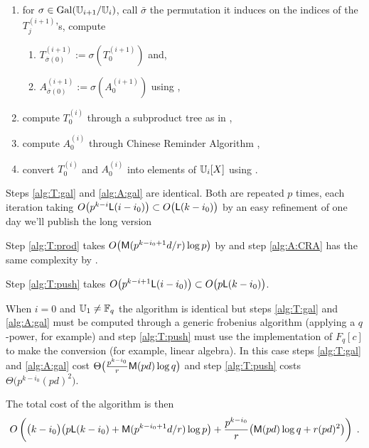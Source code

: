 \begin{enumerate}
\item for $\sigma \in \operatorname{Gal}(\mathbb{U}_{i+1}/\mathbb{U}_i)$, call $\bar\sigma$ the
  permutation it induces on the indices of the $T_j^{(i+1)}$'s,
  compute
  \begin{enumerate}
  \item\label{alg:T:gal} $T_{\bar\sigma(0)}^{(i+1)} :=
    \sigma\left(T_0^{(i+1)}\right)$ and,
  \item\label{alg:A:gal} $A_{\bar\sigma(0)}^{(i+1)} :=
    \sigma\left(A_0^{(i+1)}\right)$ using
    \cite[]{DFS09},
  \end{enumerate}
\item\label{alg:T:prod} compute $T_0^{(i)}$ through a subproduct tree
  as in \cite[Algo. 10.3]{vzGG},
\item\label{alg:A:CRA} compute $A_0^{(i)}$ through Chinese Reminder
  Algorithm \cite[Algo. 10.16]{vzGG},
\item\label{alg:T:push} convert $T_0^{(i)}$ and $A_0^{(i)}$ into
  elements of $\mathbb{U}_i[X]$ using \cite[]{DFS09}.
\end{enumerate}

Steps \ref{alg:T:gal} and \ref{alg:A:gal} are identical. Both are
repeated $p$ times, each iteration taking $O\bigl(p^{k-i}{\sf
  L}(i-i_0)\bigr) \subset O\bigl({\sf L}(k-i_0)\bigr)$ by an easy
refinement of \cite[Th. 11]{DFS09} \todo one day we'll publish the
long version \todo

Step \ref{alg:T:prod} takes $O\bigl(\mathrm{\sf M}(p^{k-i_0+1}d/r)\log p\bigr)$
by \cite[Lemma 10.4]{vzGG} and step \ref{alg:A:CRA} has the same
complexity by \cite[Coro. 10.17]{vzGG}.

Step \ref{alg:T:push} takes $O\bigl(p^{k-i+1}{\sf L}(i-i_0)\bigr)
\subset O\bigl(p{\sf L}(k-i_0)\bigr)$.

When $i=0$ and $\mathbb{U}_1\ne\mathbb{F}_q$ the algorithm is identical but steps
\ref{alg:T:gal} and \ref{alg:A:gal} must be computed through a generic
frobenius algorithm (applying a $q$-power, for example) and step
\ref{alg:T:push} must use the implementation of $F_q[c]$ to make the
conversion (for example, linear algebra). In this case steps
\ref{alg:T:gal} and \ref{alg:A:gal} cost
$\Theta\bigl(\frac{p^{k-i_0}}{r}\mathrm{\sf M}(pd)\log q \bigr)$ and step
\ref{alg:T:push} costs $\Theta\bigl(p^{k-i_0}(pd)^2\bigr)$.

The total cost of the algorithm is then
\begin{equation*}
  \label{eq:T:complexity}
  O\left(\bigl(k-i_0\bigr)\bigl(p{\sf L}(k-i_0) + \mathrm{\sf M}(p^{k-i_0+1}d/r)\log p\bigr) +
    \frac{p^{k-i_0}}{r}\bigl(\mathrm{\sf M}(pd)\log q + r(pd)^2\bigr) \right)
  \;\text{.}
\end{equation*}

